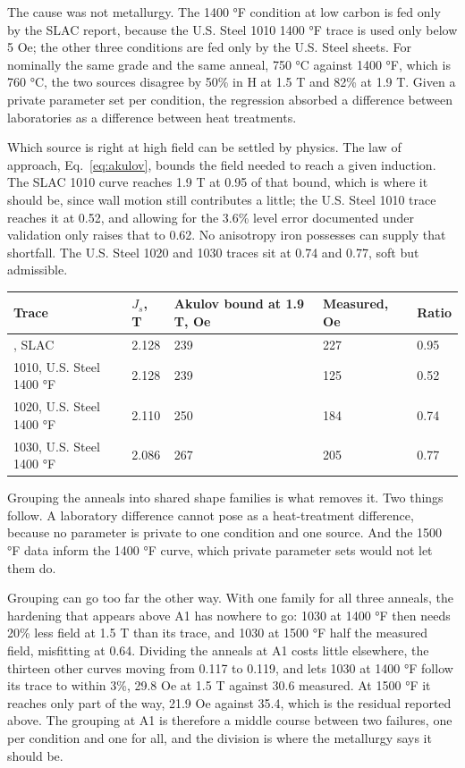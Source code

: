 \documentclass[
  11pt,
]{article}
\newcounter{none} %
\begin{document}
The cause was not metallurgy. The 1400 °F condition at low carbon is fed only by the SLAC report, because the U.S. Steel 1010 1400 °F trace is used only below 5 Oe; the other three conditions are fed only by the U.S. Steel sheets. For nominally the same grade and the same anneal, 750 °C against 1400 °F, which is 760 °C, the two sources disagree by 50\% in H at 1.5 T and 82\% at 1.9 T. Given a private parameter set per condition, the regression absorbed a difference between laboratories as a difference between heat treatments.

Which source is right at high field can be settled by physics. The law of approach, Eq.~\eqref{eq:akulov}, bounds the field needed to reach a given induction. The SLAC 1010 curve reaches 1.9 T at 0.95 of that bound, which is where it should be, since wall motion still contributes a little; the U.S. Steel 1010 trace reaches it at 0.52, and allowing for the 3.6\% level error documented under validation only raises that to 0.62. No anisotropy iron possesses can supply that shortfall. The U.S. Steel 1020 and 1030 traces sit at 0.74 and 0.77, soft but admissible.

{\def\LTcaptype{none} %
\begin{longtable}[]{@{}lllll@{}}
\toprule\noalign{}
Trace & \(J_s\), T & Akulov bound at 1.9 T, Oe & Measured, Oe & Ratio \\
\midrule\noalign{}
\endhead
\bottomrule\noalign{}
\endlastfoot
1010, SLAC & 2.128 & 239 & 227 & 0.95 \\
1010, U.S. Steel 1400 °F  & 2.128 & 239 & 125 & 0.52 \\
1020, U.S. Steel 1400 °F  & 2.110 & 250 & 184 & 0.74 \\
1030, U.S. Steel 1400 °F  & 2.086 & 267 & 205 & 0.77 \\
\end{longtable}
}

Grouping the anneals into shared shape families is what removes it. Two things follow. A laboratory difference cannot pose as a heat-treatment difference, because no parameter is private to one condition and one source. And the 1500 °F data inform the 1400 °F curve, which private parameter sets would not let them do.

Grouping can go too far the other way. With one family for all three anneals, the hardening that appears above A1 has nowhere to go: 1030 at 1400 °F then needs 20\% less field at 1.5 T than its trace, and 1030 at 1500 °F half the measured field, misfitting at 0.64. Dividing the anneals at A1 costs little elsewhere, the thirteen other curves moving from 0.117 to 0.119, and lets 1030 at 1400 °F follow its trace to within 3\%, 29.8 Oe at 1.5 T against 30.6 measured. At 1500 °F it reaches only part of the way, 21.9 Oe against 35.4, which is the residual reported above. The grouping at A1 is therefore a middle course between two failures, one per condition and one for all, and the division is where the metallurgy says it should be.
\end{document}
